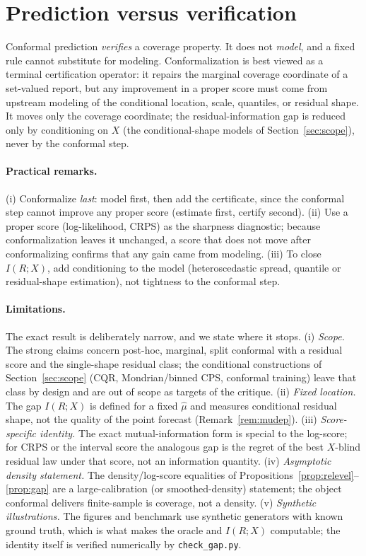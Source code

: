 \documentclass[10pt]{article} %
\theoremstyle{definition}
\begin{document}
\section{Prediction versus verification}\label{sec:verification}
Conformal prediction \emph{verifies} a coverage property. It does not \emph{model}, and a
fixed rule cannot substitute for modeling. Conformalization is best viewed as a terminal
certification operator: it repairs the marginal coverage coordinate of a set-valued report,
but any improvement in a proper score must come from upstream modeling of the conditional
location, scale, quantiles, or residual shape. It moves only the coverage coordinate; the
residual-information gap is reduced only by conditioning on $X$ (the conditional-shape models
of Section~\ref{sec:scope}), never by the conformal step.

\paragraph{Practical remarks.} (i) Conformalize \emph{last}: model first, then add the
certificate, since the conformal step cannot improve any proper score (estimate first, certify
second). (ii) Use a proper score (log-likelihood, CRPS) as the sharpness diagnostic; because
conformalization leaves it unchanged, a score that does not move after conformalizing confirms
that any gain came from modeling. (iii) To close $I(R;X)$, add conditioning to the model
(heteroscedastic spread, quantile or residual-shape estimation), not tightness to the
conformal step.

\paragraph{Limitations.} The exact result is deliberately narrow, and we state where it
stops. (i) \emph{Scope.} The strong claims concern post-hoc, marginal, split conformal with
a residual score and the single-shape residual class; the conditional constructions of
Section~\ref{sec:scope} (CQR, Mondrian/binned CPS, conformal training) leave that class by
design and are out of scope as targets of the critique. (ii) \emph{Fixed location.} The gap
$I(R;X)$ is defined for a fixed $\hat\mu$ and measures conditional residual shape, not the
quality of the point forecast (Remark~\ref{rem:mudep}). (iii) \emph{Score-specific
identity.} The exact mutual-information form is special to the log-score; for CRPS or the
interval score the analogous gap is the regret of the best $X$-blind residual law under that
score, not an information quantity. (iv) \emph{Asymptotic density statement.} The
density/log-score equalities of Propositions~\ref{prop:relevel}--\ref{prop:gap} are a
large-calibration (or smoothed-density) statement; the object conformal delivers
finite-sample is coverage, not a density. (v) \emph{Synthetic illustrations.} The figures
and benchmark use synthetic generators with known ground truth, which is what makes the
oracle and $I(R;X)$ computable; the identity itself is verified numerically by
\texttt{check\_gap.py}.
\end{document}
